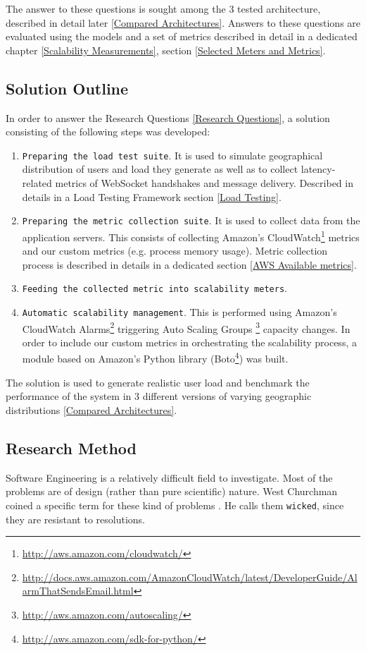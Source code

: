 \documentclass{uvamscse}
\begin{document}
The answer to these questions is sought among the 3 tested architecture, described in detail later \ref{Compared Architectures}. Answers to these questions are evaluated using the models and a set of metrics described in detail in a dedicated chapter \ref{Scalability Measurements}, section \ref{Selected Meters and Metrics}.

\subsection{Solution Outline}

In order to answer the Research Questions \ref{Research Questions}, a solution consisting of the following steps was developed:
\begin{enumerate}
  \item \texttt{Preparing the load test suite}. It is used to simulate geographical distribution of users and load they generate as well as to collect latency-related metrics of WebSocket handshakes and message delivery. Described in details in a Load Testing Framework section \ref{Load Testing}.
  \item \texttt{Preparing the metric collection suite}. It is used to collect data from the application servers. This consists of collecting Amazon's CloudWatch\footnote{\url{http://aws.amazon.com/cloudwatch/}} metrics and our custom metrics (e.g. process memory usage). Metric collection process is described in details in a dedicated section \ref{AWS Available metrics}.
  \item \texttt{Feeding the collected metric into scalability meters}.
  \item \texttt{Automatic scalability management}. This is performed using Amazon's CloudWatch Alarms\footnote{\url{http://docs.aws.amazon.com/AmazonCloudWatch/latest/DeveloperGuide/AlarmThatSendsEmail.html}} triggering Auto Scaling Groups \footnote{\url{http://aws.amazon.com/autoscaling/}} capacity changes. In order to include our custom metrics in orchestrating the scalability process, a module based on Amazon's Python library (Boto\footnote{\url{http://aws.amazon.com/sdk-for-python/}}) was built.
\end{enumerate}

The solution is used to generate realistic user load and benchmark the performance of the system in 3 different versions of varying geographic distributions \ref{Compared Architectures}.

\subsection{Research Method}\label{Research Method}
Software Engineering is a relatively difficult field to investigate. Most of the problems are of design (rather than pure scientific) nature. West Churchman coined a specific term for these kind of problems \cite{Wckd}. He calls them \texttt{wicked}, since they are resistant to resolutions.
\end{document}
